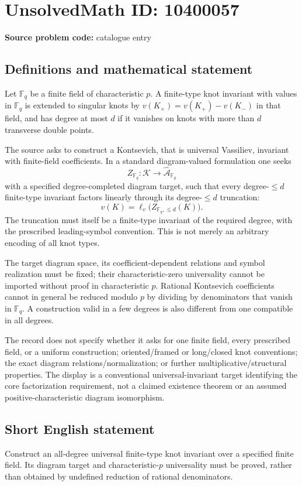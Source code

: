 \documentclass[11pt]{article}
\newcommand{\F}{\mathbb{F}}
\begin{document}
\section*{UnsolvedMath ID: 10400057}
\textbf{Source problem code:} catalogue entry
\subsection{Definitions and mathematical statement}
Let $\F_q$ be a finite field of characteristic $p$. A finite-type knot invariant with values in $\F_q$ is extended to singular knots by $v(K_\times)=v(K_+)-v(K_-)$ in that field, and has degree at most $d$ if it vanishes on knots with more than $d$ transverse double points.

The source asks to construct a Kontsevich, that is universal Vassiliev, invariant with finite-field coefficients. In a standard diagram-valued formulation one seeks
\[
Z_{\F_q}:\mathcal K\longrightarrow\widehat{\mathcal A}_{\F_q}
\]
with a specified degree-completed diagram target, such that every degree-$\leq d$ finite-type invariant factors linearly through its degree-$\leq d$ truncation:
\[
v(K)=\ell_v\bigl(Z_{\F_q,\leq d}(K)\bigr).
\]
The truncation must itself be a finite-type invariant of the required degree, with the prescribed leading-symbol convention. This is not merely an arbitrary encoding of all knot types.

The target diagram space, its coefficient-dependent relations and symbol realization must be fixed; their characteristic-zero universality cannot be imported without proof in characteristic $p$. Rational Kontsevich coefficients cannot in general be reduced modulo $p$ by dividing by denominators that vanish in $\F_q$. A construction valid in a few degrees is also different from one compatible in all degrees.

The record does not specify whether it asks for one finite field, every prescribed field, or a uniform construction; oriented/framed or long/closed knot conventions; the exact diagram relations/normalization; or further multiplicative/structural properties. The display is a conventional universal-invariant target identifying the core factorization requirement, not a claimed existence theorem or an assumed positive-characteristic diagram isomorphism.
\subsection{Short English statement}
Construct an all-degree universal finite-type knot invariant over a specified finite field. Its diagram target and characteristic-$p$ universality must be proved, rather than obtained by undefined reduction of rational denominators.
\end{document}
